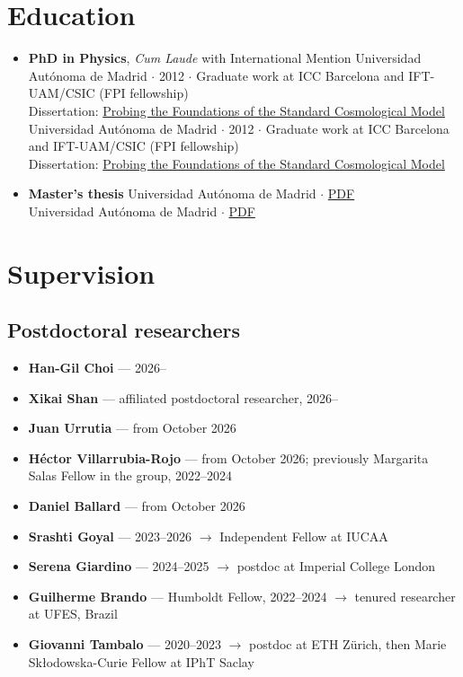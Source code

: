 \documentclass[11pt,a4paper]{article}
\newcommand{\entry}[2]{%
  \item {#1}%
  \ifx\relax#2\relax\else\\[0.1em]{\small\color{soft}#2}\fi
}
\newenvironment{entries}
  {\begin{itemize}[leftmargin=1.1em,itemsep=0.32em,parsep=0pt,topsep=0.3em]}
  {\end{itemize}}
\newenvironment{plainlist}
  {\begin{itemize}[leftmargin=1.1em,itemsep=0.2em,parsep=0pt,topsep=0.3em]}
  {\end{itemize}}
\begin{document}
\section{Education}
\begin{entries}
  \entry{\textbf{PhD in Physics}, \emph{Cum Laude} with International Mention}
        {Universidad Autónoma de Madrid $\cdot$ 2012 $\cdot$ Graduate work at ICC Barcelona and IFT-UAM/CSIC (FPI fellowship)\\
         Dissertation: \href{https://miguelzuma.github.io/files/PhD_thesis_miguel_zuma.pdf}{Probing the Foundations of the Standard Cosmological Model}}
  \entry{\textbf{Master's thesis}}
        {Universidad Autónoma de Madrid $\cdot$
         \href{https://miguelzuma.github.io/files/master_thesis_miguel_zuma.pdf}{PDF}}
\end{entries}

\section{Supervision}

\subsection{Postdoctoral researchers}
\begin{plainlist}
  \item \textbf{Han-Gil Choi} --- 2026--
  \item \textbf{Xikai Shan} --- affiliated postdoctoral researcher, 2026--
  \item \textbf{Juan Urrutia} --- from October 2026
  \item \textbf{Héctor Villarrubia-Rojo} --- from October 2026; previously Margarita Salas Fellow in the group, 2022--2024
  \item \textbf{Daniel Ballard} --- from October 2026
  \item \textbf{Srashti Goyal} --- 2023--2026 $\rightarrow$ Independent Fellow at IUCAA
  \item \textbf{Serena Giardino} --- 2024--2025 $\rightarrow$ postdoc at Imperial College London
  \item \textbf{Guilherme Brando} --- Humboldt Fellow, 2022--2024 $\rightarrow$ tenured researcher at UFES, Brazil
  \item \textbf{Giovanni Tambalo} --- 2020--2023 $\rightarrow$ postdoc at ETH Zürich, then Marie Skłodowska-Curie Fellow at IPhT Saclay
\end{plainlist}
\end{document}
